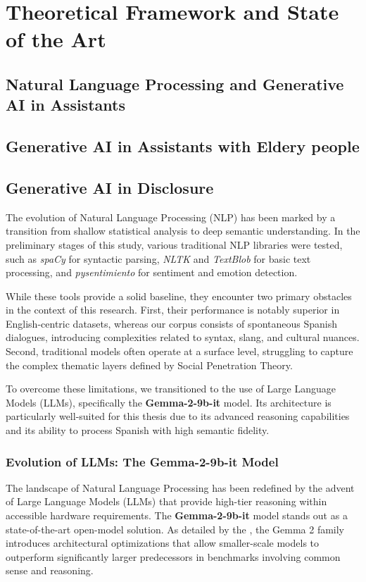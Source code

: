 
\section{Theoretical Framework and State of the Art}

    
    
    \subsection{Natural Language Processing and Generative AI in Assistants}
    \subsection{Generative AI in Assistants with Eldery people}
    \subsection{Generative AI in Disclosure}

The evolution of Natural Language Processing (NLP) has been marked by a transition from shallow statistical analysis to deep semantic understanding. In the preliminary stages of this study, various traditional NLP libraries were tested, such as \textit{spaCy} for syntactic parsing, \textit{NLTK} and \textit{TextBlob} for basic text processing, and \textit{pysentimiento} for sentiment and emotion detection. 

While these tools provide a solid baseline, they encounter two primary obstacles in the context of this research. First, their performance is notably superior in English-centric datasets, whereas our corpus consists of spontaneous Spanish dialogues, introducing complexities related to syntax, slang, and cultural nuances. Second, traditional models often operate at a surface level, struggling to capture the complex thematic layers defined by Social Penetration Theory.

To overcome these limitations, we transitioned to the use of Large Language Models (LLMs), specifically the \textbf{Gemma-2-9b-it} model. Its architecture is particularly well-suited for this thesis due to its advanced reasoning capabilities and its ability to process Spanish with high semantic fidelity. 
    
        \subsubsection{Evolution of LLMs: The Gemma-2-9b-it Model}

The landscape of Natural Language Processing has been redefined by the advent of Large Language Models (LLMs) that provide high-tier reasoning within accessible hardware requirements. The \textbf{Gemma-2-9b-it} model stands out as a state-of-the-art open-model solution. As detailed by the \cite{https://doi.org/10.48550/arxiv.2408.00118}, the Gemma 2 family introduces architectural optimizations that allow smaller-scale models to outperform significantly larger predecessors in benchmarks involving common sense and reasoning.

